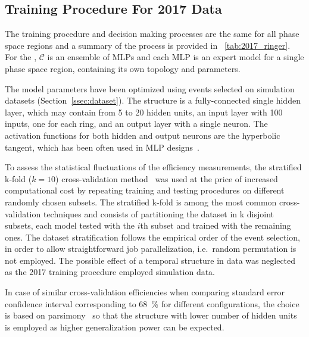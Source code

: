 






\subsection{Training Procedure For 2017 Data}\label{ssec:2017}

The training procedure and decision making processes are the same for all phase
space regions and a summary of the process is provided in
\tablename~\ref{tab:2017_ringer}. For the \rnn{}, $\mathcal{C}$ is an ensemble of
MLPs and each MLP is an expert model for a single phase space
region, containing its own topology and parameters.

The model parameters have been optimized using events selected on simulation datasets
(Section~\ref{ssec:dataset}). The structure is a fully-connected single
hidden layer, which may contain from 5 to 20 hidden units, an input layer with 100 inputs, one for each ring, and an output layer with a single neuron. The activation
functions for both hidden and output neurons are the hyperbolic tangent, which has been often used in MLP designs~\cite{haykin_2008}. 

To assess the statistical fluctuations of the efficiency measurements, the stratified k-fold ($k=10$) cross-validation method~\cite{haykin_2008} was used at the price of increased computational cost by repeating training and testing procedures on different
randomly chosen subsets. The stratified k-fold is
among the most common cross-validation techniques and consists of partitioning
the dataset in k disjoint subsets, each model tested with the $i$th subset and
trained with the remaining ones. The dataset stratification follows the
empirical order of the event selection, in order to allow straightforward job
parallelization, i.e.\ random permutation is not employed. The possible effect
of a temporal structure in data was neglected as the 2017 training procedure
employed simulation data.

In case of similar cross-validation efficiencies when comparing standard
error confidence interval corresponding to \SI{68}{\%} for different
configurations, the choice is based on
parsimony~\cite{haykin_2008, medeiros2001statistical} so that the structure with lower number of hidden units
is employed as higher generalization power can be expected. 






